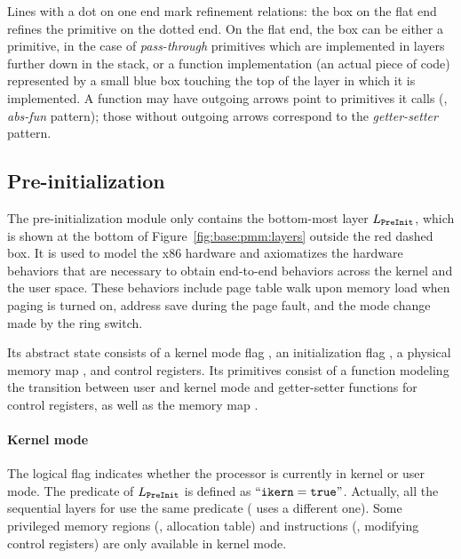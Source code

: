 Lines with a dot on one end mark refinement relations: the box on the
flat end refines the primitive on the dotted end. On the flat end, the
box can be either a primitive, in the case of \emph{pass-through}
primitives which are implemented in layers further down in the stack,
or a function implementation (an actual piece of code) represented by
a small blue box touching the top of the layer in which it is
implemented.  A function may have outgoing arrows point to primitives
it calls (\ie, \emph{abs-fun} pattern); those without
outgoing arrows correspond to the \emph{getter-setter} pattern.

\subsection{Pre-initialization}
\label{sec:base:preinit}
The pre-initialization module only contains the bottom-most layer
$L_{\texttt{PreInit}}$, which is shown at the bottom of Figure~\ref{fig:base:pmm:layers} outside the red dashed box. It is used to model the x86 hardware and axiomatizes the
hardware behaviors that are necessary to obtain end-to-end behaviors
across the kernel and the user space. These behaviors include page
table walk upon memory load when paging is turned on, 
address save during the page fault,
and the mode change made by the ring switch.
Its abstract state consists of a kernel mode flag ,
an initialization flag ,
a physical memory map ,
and control registers.
Its primitives consist of
a function modeling the transition between user and kernel mode
and 
getter-setter functions for control registers, as well as the memory map .

\paragraph{Kernel mode} The logical flag  indicates
whether the processor is currently in kernel or user mode.
The  predicate of $L_{\texttt{PreInit}}$
is defined as $``{\texttt{ikern}} ={\texttt{true}}"$.
Actually, all the sequential layers for \mCTOS{} use the same
  predicate
 (\mCTOShyper{} uses a different one).
Some privileged
memory regions (\eg, allocation table) and 
instructions (\eg, modifying control registers)
are only available in kernel mode.



